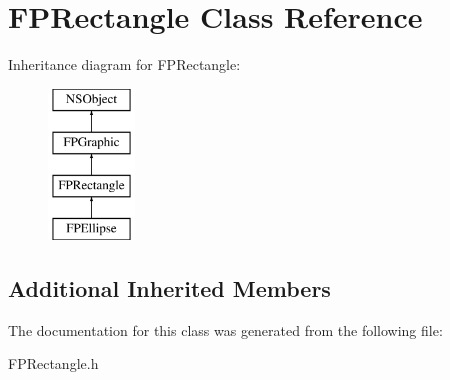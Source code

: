 \hypertarget{interface_f_p_rectangle}{}\section{F\+P\+Rectangle Class Reference}
\label{interface_f_p_rectangle}
Inheritance diagram for F\+P\+Rectangle\+:\begin{figure}[H]
\begin{center}
\leavevmode
\includegraphics[height=4.000000cm]{interface_f_p_rectangle}
\end{center}
\end{figure}
\subsection*{Additional Inherited Members}


The documentation for this class was generated from the following file\+:\begin{DoxyCompactItemize}
\item 
F\+P\+Rectangle.\+h\end{DoxyCompactItemize}
